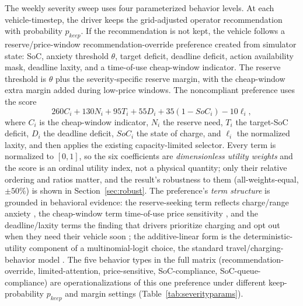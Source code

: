 \documentclass[12pt]{article}
\begin{document}
The weekly severity sweep uses four parameterized behavior levels. At each vehicle-timestep, the driver keeps the grid-adjusted operator recommendation with probability $p_{keep}$. If the recommendation is not kept, the vehicle follows a reserve/price-window recommendation-override preference created from simulator state: SoC, anxiety threshold $\theta$, target deficit, deadline deficit, action availability mask, deadline laxity, and a time-of-use cheap-window indicator. The reserve threshold is $\theta$ plus the severity-specific reserve margin, with the cheap-window extra margin added during low-price windows. The noncompliant preference uses the score
\begin{equation}
260C_i + 130N_i + 95T_i + 55D_i + 35(1-SoC_i)-10\ell_i,
\label{eq:severitypref}
\end{equation}
where $C_i$ is the cheap-window indicator, $N_i$ the reserve need, $T_i$ the target-SoC deficit, $D_i$ the deadline deficit, $SoC_i$ the state of charge, and $\ell_i$ the normalized laxity, and then applies the existing capacity-limited selector. Every term is normalized to $[0,1]$, so the six coefficients are \emph{dimensionless utility weights} and the score is an ordinal utility index, not a physical quantity; only their relative ordering and ratios matter, and the result's robustness to them (all-weights-equal, $\pm50\%$) is shown in Section~\ref{sec:robust}. The preference's \emph{term structure} is grounded in behavioral evidence: the reserve-seeking term reflects charge/range anxiety \cite{schmalfuss2015,hardman2018,will2016}, the cheap-window term time-of-use price sensitivity \cite{bailey2025fieldexp,delmonte2020,marxen2023flexibility}, and the deadline/laxity terms the finding that drivers prioritize charging and opt out when they need their vehicle soon \cite{alexeenko2023pilot,dudek2021electricnation}; the additive-linear form is the deterministic-utility component of a multinomial-logit choice, the standard travel/charging-behavior model \cite{mcfadden1974,daina2017}. The five behavior types in the full matrix (recommendation-override, limited-attention, price-sensitive, SoC-compliance, SoC-queue-compliance) are operationalizations of this one preference under different keep-probability $p_{keep}$ and margin settings (Table~\ref{tab:severityparams}).
\end{document}
